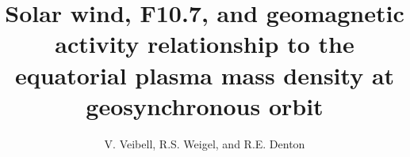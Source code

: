 \documentclass[12pt]{article}
\begin{document}
\title{Solar wind, F10.7, and geomagnetic activity relationship to the equatorial plasma mass density at geosynchronous orbit}
\author{V. Veibell, R.S. Weigel, and R.E. Denton}
\doublespacing
\maketitle






\end{document}
